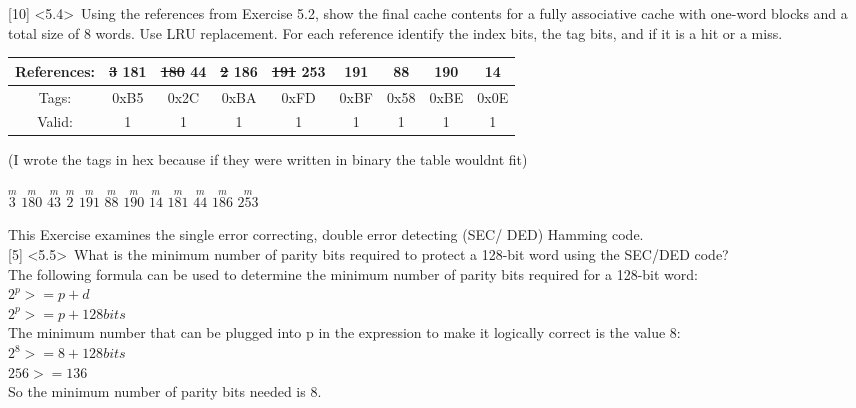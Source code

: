 \documentclass[12pt]{article}
\begin{document}
	
	
	\noindent {} 
	[10] \textless5.4\textgreater \ Using the references from Exercise 5.2, show the final cache
	contents for a fully associative cache with one-word blocks and a total size of 8 words.
	Use LRU replacement. For each reference identify the index bits, the tag bits, and if it
	is a hit or a miss. \\
	
	
	\begin{center}
		\begin{tabular}{ |c|c|c|c|c|c|c|c|c| } 
			\hline
			References: & \sout{3} 181 & \sout{180} 44 & \sout{2} 186 & \sout{191} 253 & 191 & 88 & 190 & 14  \\
			\hline
			Tags: & 0xB5 & 0x2C & 0xBA & 0xFD & 0xBF & 0x58 & 0xBE & 0x0E \\
			\hline
			Valid:& 1 & 1 & 1 & 1 & 1 & 1 & 1 & 1 \\
			\hline
					
		\end{tabular}
		(I wrote the tags in hex because if they were written in binary the table wouldnt fit) \\
		\vspace{0.3cm} \\
		
		$\overset{m}{3}$ $\overset{m}{180}$ $\overset{m}{43}$ $\overset{m}{2}$ $\overset{m}{191}$ $\overset{m}{88}$ $\overset{m}{190}$ $\overset{m}{14}$ $\overset{m}{181}$ $\overset{m}{44}$ $\overset{m}{186}$ $\overset{m}{253}$  \vspace{0.5cm} \\
	\end{center}
	
	
	
	
	\noindent {} 
	This Exercise examines the single error correcting, double error detecting (SEC/
	DED) Hamming code. \vspace{0.3cm} \\
	
	\noindent {} 
	[5] \textless5.5\textgreater \ What is the minimum number of parity bits required to protect a
	128-bit word using the SEC/DED code? \\
	
	The following formula can be used to determine the minimum number of parity bits required for a 128-bit word:  \\
	
	\noindent $2^p >= p + d $ \\
	$2^p >= p + 128bits$ \\
	
	\noindent The minimum number that can be plugged into p in the expression to make it logically correct is the value 8: \\
	
	\noindent $2^8 >= 8 + 128bits$ \\
	$256 >= 136$\\
	
	\noindent So the minimum number of parity bits needed is 8. \\
	
	
\end{document}
